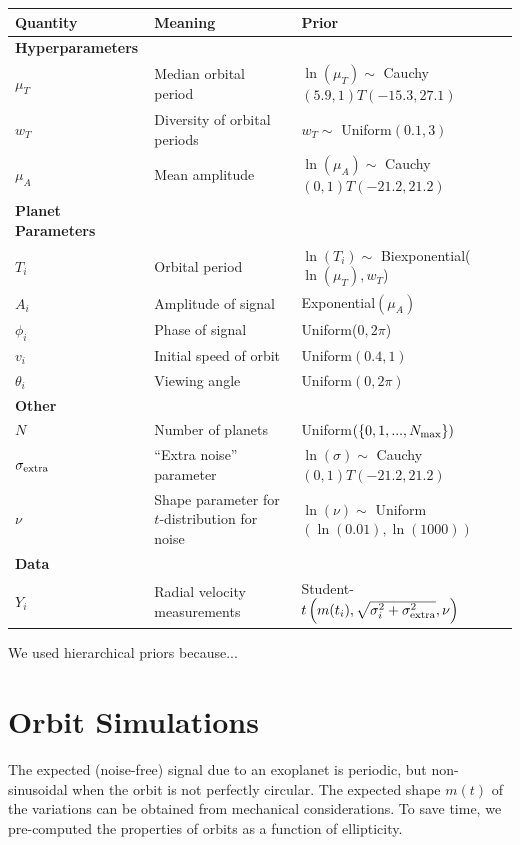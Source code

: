 \documentclass[useAMS,usenatbib]{mn2e}
\begin{document}
\begin{table}
\begin{tabular}{|l|l|l|}
\hline
Quantity	&	Meaning		& Prior\\
\hline
{\bf Hyperparameters}	&	\\
$\mu_T$		&	Median orbital period	& $\ln(\mu_T) \sim$ Cauchy$(5.9, 1)T(-15.3, 27.1)$\\
$w_T$		&	Diversity of orbital periods & $w_T \sim$ Uniform$(0.1, 3)$\\
$\mu_A$		&	Mean amplitude	& $\ln(\mu_A) \sim$ Cauchy$(0, 1)T(-21.2, 21.2)$\\
\hline
{\bf Planet Parameters}\\
$T_i$		&	Orbital period	&	$\ln(T_i) \sim $ Biexponential($\ln(\mu_T), w_T$)\\
$A_i$		&	Amplitude of signal	& Exponential$(\mu_A)$\\
$\phi_i$	&	Phase of signal	&	Uniform($0, 2\pi$)\\
$v_i$		&	Initial speed of orbit	&	Uniform$(0.4, 1)$\\
$\theta_i$	&	Viewing angle	&	Uniform$(0, 2\pi)$\\
\hline
{\bf Other}\\
$N$		& Number of planets	& Uniform$(\{0, 1, ..., N_{\rm max}\})$\\
$\sigma_{\rm extra}$	& ``Extra noise'' parameter	& $\ln(\sigma) \sim$ Cauchy$(0, 1)T(-21.2, 21.2)$\\
$\nu$		& Shape parameter for $t$-distribution for noise & $\ln(\nu) \sim$ Uniform$(\ln(0.01), \ln(1000))$\\
\hline
{\bf Data}\\
$Y_i$		& Radial velocity measurements	&
		Student-$t\left(m(t_i), \sqrt{\sigma_i^2 + \sigma_{\rm extra}^2}, \nu\right)$
\end{tabular}
\end{table}

We used hierarchical priors because...

\section{Orbit Simulations}
The expected (noise-free) signal due to an exoplanet is periodic, but
non-sinusoidal when the orbit is not perfectly circular. The expected
shape $m(t)$ of the variations can be obtained from mechanical considerations.
To save time, we pre-computed the properties of orbits as a function of
ellipticity.
\end{document}
